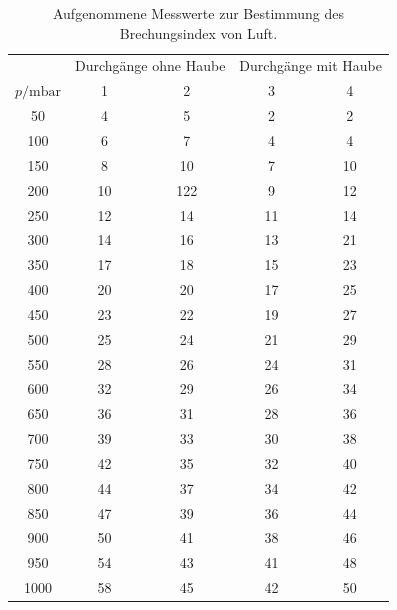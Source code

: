 \begin{table}[H]
  \centering
  \caption{Aufgenommene Messwerte zur Bestimmung des Brechungsindex von Luft.}
  \label{tab:Luft}
  \begin{tabular}{c c c c c}
    \toprule
    & \multicolumn{2}{c}{Durchgänge ohne Haube} & \multicolumn{2}{c}{Durchgänge mit Haube} \\
    \cmidrule(lr){2-3} \cmidrule(lr){4-5}
    $p / \si{\milli\bar}$ & 1 &2 &3 &4  \\
    \midrule
    50    &   4    &   5    &   2     &    2   \\
    100   &   6    &   7    &   4     &    4   \\
    150   &   8    &   10   &   7     &    10  \\
    200   &   10   &   122  &   9     &    12  \\
    250   &   12   &   14   &   11    &    14  \\
    300   &   14   &   16   &   13    &    21  \\
    350   &   17   &   18   &   15    &    23  \\
    400   &   20   &   20   &   17    &    25  \\
    450   &   23   &   22   &   19    &    27  \\
    500   &   25   &   24   &   21    &    29  \\
    550   &   28   &   26   &   24    &    31  \\
    600   &   32   &   29   &   26    &    34  \\
    650   &   36   &   31   &   28    &    36  \\
    700   &   39   &   33   &   30    &    38  \\
    750   &   42   &   35   &   32    &    40  \\
    800   &   44   &   37   &   34    &    42  \\
    850   &   47   &   39   &   36    &    44  \\
    900   &   50   &   41   &   38    &    46  \\
    950   &   54   &   43   &   41    &    48  \\
    1000  &   58   &   45   &   42    &    50  \\ 
    \bottomrule
  \end{tabular}
\end{table}

